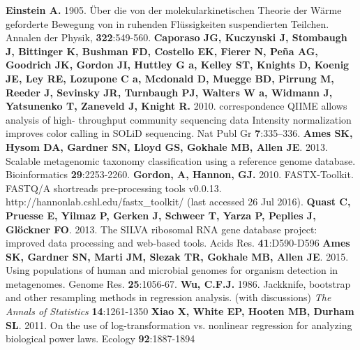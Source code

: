 \documentclass[12pt,oneside,letterpaper]{article}
\begin{document}
\begin{thebibliography}{99}
 {\bf Einstein A.} 1905. Über die von der molekularkinetischen Theorie der Wärme geforderte Bewegung von in ruhenden Flüssigkeiten suspendierten Teilchen. Annalen der Physik, {\bf 322}:549-560.
 {\bf Caporaso JG, Kuczynski J, Stombaugh J, Bittinger K, Bushman FD, Costello EK, Fierer N, Peña AG, Goodrich JK, Gordon JI, Huttley G a, Kelley ST, Knights D, Koenig JE, Ley RE, Lozupone C a, Mcdonald D, Muegge BD, Pirrung M, Reeder J, Sevinsky JR, Turnbaugh PJ, Walters W a, Widmann J, Yatsunenko T, Zaneveld J, Knight R.} 2010. correspondence QIIME allows analysis of high- throughput community sequencing data Intensity normalization improves color calling in SOLiD sequencing. Nat Publ Gr {\bf 7}:335–336.
 {\bf Ames SK, Hysom DA, Gardner SN, Lloyd GS, Gokhale MB, Allen JE}.  2013. Scalable metagenomic taxonomy classification using a reference genome database.  Bioinformatics {\bf 29}:2253-2260.
 {\bf Gordon, A, Hannon, GJ.} 2010. FASTX-Toolkit. FASTQ/A shortreads pre-processing tools v0.0.13. http://hannonlab.cshl.edu/fastx\_toolkit/ (last accessed 26 Jul 2016).
 {\bf Quast C, Pruesse E, Yilmaz P, Gerken J, Schweer T, Yarza P, Peplies J, Glöckner FO}. 2013. The SILVA ribosomal RNA gene database project: improved data processing and web-based tools. Acids Res. {\bf 41}:D590-D596
 {\bf Ames SK, Gardner SN, Marti JM, Slezak TR, Gokhale MB, Allen JE}. 2015. Using populations of human and microbial genomes for organism detection in metagenomes. Genome Res. {\bf 25}:1056-67.
 {\bf Wu, C.F.J.} 1986. Jackknife, bootstrap and other resampling methods in regression analysis. (with discussions) \textit{The Annals of Statistics} {\bf 14}:1261-1350 
 {\bf Xiao X, White EP, Hooten MB, Durham SL}. 2011. On the use of log-transformation vs. nonlinear regression for analyzing biological power laws. Ecology {\bf 92}:1887-1894
\end{thebibliography}
\end{document}
